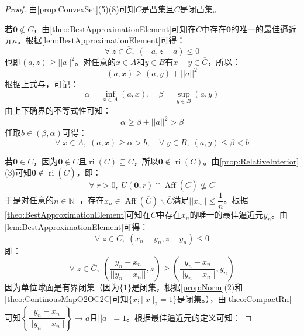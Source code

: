 \begin{proof}
	由\cref{prop:ConvexSet}(5)(8)可知$C$是凸集且$\overline{C}$是闭凸集。\par
	若$\mathbf{0}\notin\overline{C}$，由\cref{theo:BestApproximationElement}可知在$\overline{C}$中存在$\mathbf{0}$的唯一的最佳逼近元$a$。根据\cref{lem:BestApproximationElement}可得：
	\begin{equation*}
		\forall\;z\in\overline{C},\;(-a,z-a)\leqslant0
	\end{equation*}
	也即$(a,z)\geqslant||a||^2$。对任意的$x\in A$和$y\in B$有$x-y\in\overline{C}$，所以：
	\begin{equation*}
		(a,x)\geqslant(a,y)+||a||^2
	\end{equation*}
	根据上式与，可记：
	\begin{equation*}
		\alpha=\inf_{x\in A}(a,x),\quad\beta=\sup_{y\in B}(a,y)
	\end{equation*}
	由上下确界的不等式性可知：
	\begin{equation*}
		\alpha\geqslant\beta+||a||^2>\beta
	\end{equation*}
	任取$b\in(\beta,\alpha)$可得：
	\begin{equation*}
		\forall\;x\in A,\;(a,x)\geqslant\alpha>b,\quad\forall\;y\in B,\;(a,y)\leqslant\beta<b
	\end{equation*}\par
	若$\mathbf{0}\in\overline{C}$，因为$\mathbf{0}\not\in C$且$\operatorname{ri}(C)\subseteq C$，所以$\mathbf{0}\notin\operatorname{ri}(C)$。由\cref{prop:RelativeInterior}(3)可知$\mathbf{0}\notin\operatorname{ri}(\overline{C})$，即：
	\begin{equation*}
		\forall\;r>0,\;U(\mathbf{0},r)\cap\operatorname{Aff}(\overline{C})\nsubseteq\overline{C}
	\end{equation*}
	于是对任意的$n\in\mathbb{N}^+$，存在$x_n\in\operatorname{Aff}(\overline{C})\backslash\overline{C}$满足$||x_n||\leqslant\dfrac{1}{n}$。根据\cref{theo:BestApproximationElement}可知在$\overline{C}$中存在$x_n$的唯一的最佳逼近元$y_n$。由\cref{lem:BestApproximationElement}可得：
	\begin{equation*}
		\forall\;z\in\overline{C},\;(x_n-y_n,z-y_n)\leqslant0
	\end{equation*}
	即：
	\begin{equation*}
		\forall\;z\in\overline{C},\;\left(\frac{y_n-x_n}{||y_n-x_n||},z\right)\geqslant\left(\frac{y_n-x_n}{||y_n-x_n||},y_n\right)
	\end{equation*}
	因为单位球面是有界闭集（因为$\{1\}$是闭集，根据\cref{prop:Norm}(2)和\cref{theo:ContinousMapO2OC2C}可知$\{x;||x||_2=1\}$是闭集。），由\cref{theo:CompactRn}可知$\left\{\dfrac{y_n-x_n}{||y_n-x_n||}\right\}\to a$且$||a||=1$。根据最佳逼近元的定义可知：

\end{proof}
